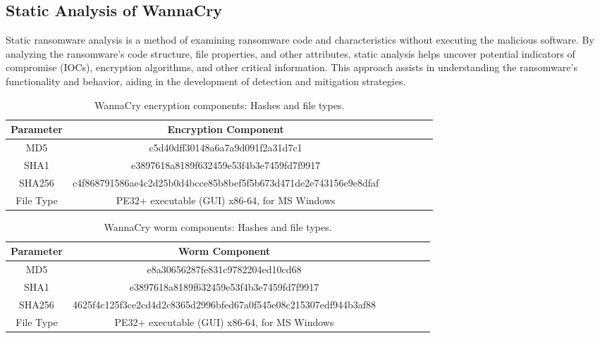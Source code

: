 \documentclass[12pt,letterpaper]{article}
\begin{document}
    \subsection{Static Analysis of WannaCry}

        Static ransomware analysis is a method of examining ransomware code and characteristics without executing the malicious software. By analyzing the ransomware's code structure, file properties, and other attributes, static analysis helps uncover potential indicators of compromise (IOCs), encryption algorithms, and other critical information. This approach assists in understanding the ransomware's functionality and behavior, aiding in the development of detection and mitigation strategies.
    
            \begin{table}[h]
                \centering
                \caption{WannaCry encryption components: Hashes and file types.}
                \label{tab:WannaCry Exec Components}
                \begin{tabular}{ccccccc}
                    \toprule
                    \textbf{Parameter} & \textbf{Encryption Component} \\
                    \midrule
                    MD5 & c5d40dff30148a6a7a9d091f2a31d7c1 \\
                    SHA1 & e3897618a8189f632459e53f4b3e7459fd7f9917 \\
                    SHA256 & c4f868791586ae4c2d25b0d4bcce85b8bef5f5b673d471de2e743156e9e8dfaf \\
                    File Type & PE32+ executable (GUI) x86-64, for MS Windows \\
                    \bottomrule
                \end{tabular}
            \end{table}

            \begin{table}[htbp]
                \centering
                \caption{WannaCry worm components: Hashes and file types.}
                \label{tab:WannaCry Worm Components}
                \begin{tabular}{ccccccc}
                    \toprule
                    \textbf{Parameter} & \textbf{Worm Component} \\
                    \midrule
                    MD5 & e8a30656287fe831c9782204ed10cd68 \\
                    SHA1 & e3897618a8189f632459e53f4b3e7459fd7f9917 \\
                    SHA256 & 4625f4c125f3ce2cd4d2c8365d2996bfed67a0f545e08c215307edf944b3af88 \\
                    File Type & PE32+ executable (GUI) x86-64, for MS Windows \\
                    \bottomrule
                \end{tabular}
            \end{table}
\end{document}
